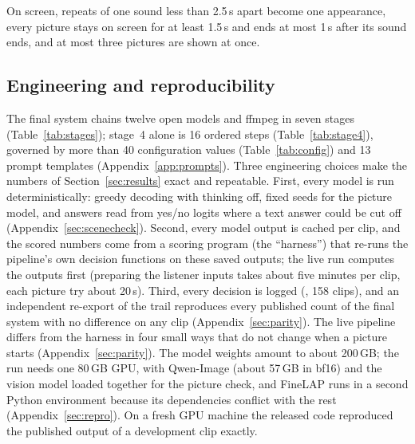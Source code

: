 On screen, repeats of one sound less than 2.5\,s apart become one appearance, every picture stays on screen for at least
1.5\,s and ends at most 1\,s after its sound ends, and at most three pictures are shown at once.

\subsection{Engineering and reproducibility}\label{sec:engineering}
The final system chains twelve open models and ffmpeg in seven stages (Table~\ref{tab:stages}); stage~4 alone is 16
ordered steps (Table~\ref{tab:stage4}), governed by more than 40 configuration values (Table~\ref{tab:config}) and 13
prompt templates (Appendix~\ref{app:prompts}). Three engineering choices make the numbers of Section~\ref{sec:results}
exact and repeatable. First, every model is run deterministically: greedy decoding with thinking off, fixed seeds for
the picture model, and answers read from yes/no logits where a text answer could be cut off
(Appendix~\ref{sec:scenecheck}). Second, every model output is cached per clip, and the scored numbers come from a
scoring program (the ``harness'') that re-runs the pipeline's own decision functions on these saved outputs; the live
run computes the outputs first (preparing the listener inputs takes about five minutes per clip, each picture try about
20\,s). Third, every decision is logged (, 158 clips), and an independent re-export of the
trail reproduces every published count of the final system with no difference on any clip (Appendix~\ref{sec:parity}). The live pipeline
differs from the harness in four small ways that do not change when a picture starts (Appendix~\ref{sec:parity}). The
model weights amount to about 200\,GB; the run needs one 80\,GB GPU, with Qwen-Image (about 57\,GB in bf16) and the
vision model loaded together for the picture check, and FineLAP runs in a second Python environment because its
dependencies conflict with the rest (Appendix~\ref{sec:repro}). On a fresh GPU machine the released code reproduced the
published output of a development clip exactly.
